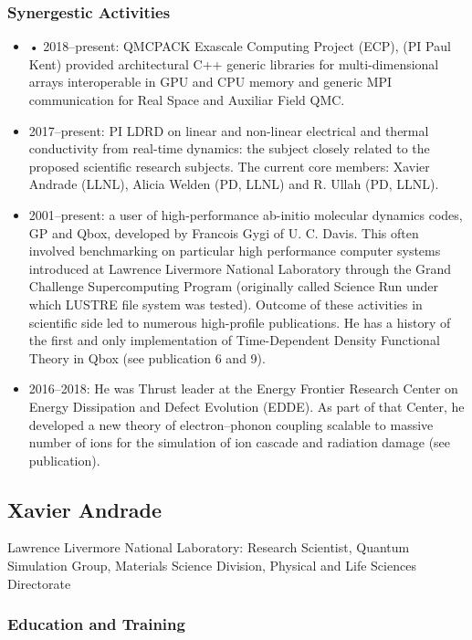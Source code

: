 \subsubsection*{Synergestic Activities}
\begin{itemize}
    \item •	2018–present: QMCPACK Exascale Computing Project (ECP), (PI Paul Kent) provided architectural C++ generic libraries for multi-dimensional arrays interoperable in GPU and CPU memory and generic MPI communication for Real Space and Auxiliar Field QMC.
    \item 2017–present: PI LDRD on linear and non-linear electrical and thermal conductivity from real-time dynamics: the subject closely related to the proposed scientific research subjects. The current core members: Xavier Andrade (LLNL), Alicia Welden (PD, LLNL) and R. Ullah (PD, LLNL).
    \item 2001–present: a user of high-performance ab-initio molecular dynamics codes, GP and Qbox, developed by Francois Gygi of U. C. Davis. This often involved benchmarking on particular high performance computer systems introduced at Lawrence Livermore National Laboratory through the Grand Challenge Supercomputing Program (originally called Science Run under which LUSTRE file system was tested). Outcome of these activities in scientific side led to numerous high-profile publications. He has a history of the first and only implementation of Time-Dependent Density Functional Theory in Qbox (see publication 6 and 9).
    \item 2016–2018: He was Thrust leader at the Energy Frontier Research Center on Energy Dissipation and Defect Evolution (EDDE). As part of that Center, he developed a new theory of electron–phonon coupling scalable to massive number of ions for the simulation of ion cascade and radiation damage (see publication).
\end{itemize}
\clearpage

\subsection*{Xavier Andrade}
Lawrence Livermore National Laboratory: Research Scientist, Quantum Simulation Group, Materials Science Division, Physical and Life Sciences Directorate

\subsubsection*{Education and Training}

